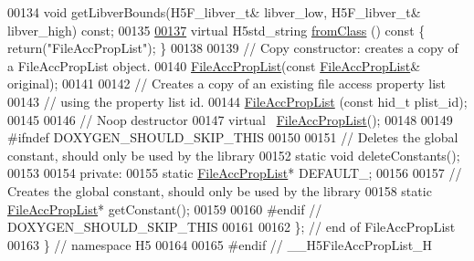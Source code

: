 \begin{DoxyCode}
00134         \textcolor{keywordtype}{void} getLibverBounds(H5F\_libver\_t& libver\_low, H5F\_libver\_t& libver\_high) \textcolor{keyword}{const};
00135 
\hyperlink{class_h5_1_1_file_acc_prop_list_a91008d21823c623382ab9c6e6640f67d}{00137}         \textcolor{keyword}{virtual} H5std\_string \hyperlink{class_h5_1_1_file_acc_prop_list_a91008d21823c623382ab9c6e6640f67d}{fromClass} ()\textcolor{keyword}{ const }\{ \textcolor{keywordflow}{return}(\textcolor{stringliteral}{"FileAccPropList"}); \}
00138 
00139         \textcolor{comment}{// Copy constructor: creates a copy of a FileAccPropList object.}
00140         \hyperlink{class_h5_1_1_file_acc_prop_list}{FileAccPropList}(\textcolor{keyword}{const} \hyperlink{class_h5_1_1_file_acc_prop_list}{FileAccPropList}& original);
00141 
00142         \textcolor{comment}{// Creates a copy of an existing file access property list}
00143         \textcolor{comment}{// using the property list id.}
00144         \hyperlink{class_h5_1_1_file_acc_prop_list}{FileAccPropList} (\textcolor{keyword}{const} hid\_t plist\_id);
00145 
00146         \textcolor{comment}{// Noop destructor}
00147         \textcolor{keyword}{virtual} ~\hyperlink{class_h5_1_1_file_acc_prop_list}{FileAccPropList}();
00148 
00149 \textcolor{preprocessor}{#ifndef DOXYGEN\_SHOULD\_SKIP\_THIS}
00150 
00151         \textcolor{comment}{// Deletes the global constant, should only be used by the library}
00152         \textcolor{keyword}{static} \textcolor{keywordtype}{void} deleteConstants();
00153 
00154     \textcolor{keyword}{private}:
00155         \textcolor{keyword}{static} \hyperlink{class_h5_1_1_file_acc_prop_list}{FileAccPropList}* DEFAULT\_;
00156 
00157         \textcolor{comment}{// Creates the global constant, should only be used by the library}
00158         \textcolor{keyword}{static} \hyperlink{class_h5_1_1_file_acc_prop_list}{FileAccPropList}* getConstant();
00159 
00160 \textcolor{preprocessor}{#endif // DOXYGEN\_SHOULD\_SKIP\_THIS}
00161 
00162 \}; \textcolor{comment}{// end of FileAccPropList}
00163 \} \textcolor{comment}{// namespace H5}
00164 
00165 \textcolor{preprocessor}{#endif // \_\_H5FileAccPropList\_H}
\end{DoxyCode}
